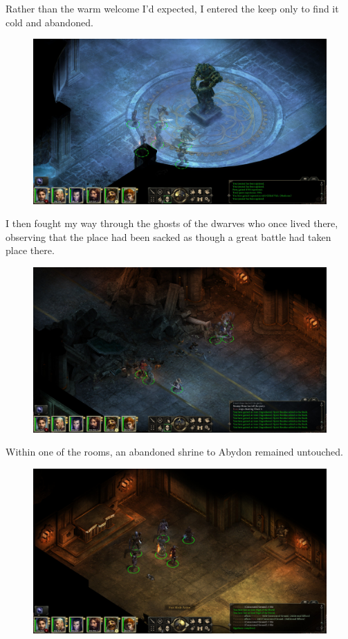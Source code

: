 \documentclass{article}
\begin{document}
Rather than the warm welcome I'd expected, I entered the keep only to find it cold and abandoned.

\begin{figure}
\includegraphics[scale=0.33]{files/blog/2019_08_17_poe_potd_wmpt1/2019_08_17_durgans_battery_02.jpg}
\end{figure}

I then fought my way through the ghosts of the dwarves who once lived there, observing that the place had been sacked as though a great battle had taken place there.

\begin{figure}
\includegraphics[scale=0.33]{files/blog/2019_08_17_poe_potd_wmpt1/2019_08_17_durgans_battery_03.jpg}
\end{figure}

Within one of the rooms, an abandoned shrine to Abydon remained untouched.

\begin{figure}
\includegraphics[scale=0.33]{files/blog/2019_08_17_poe_potd_wmpt1/2019_08_17_durgans_battery_04.jpg}
\end{figure}
\end{document}
